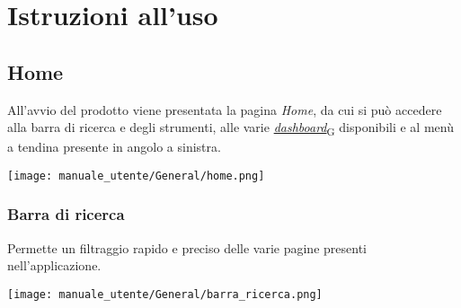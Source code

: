 \section{Istruzioni all'uso}
\subsection{Home}
All'avvio del prodotto viene presentata la pagina \textit{Home}, da cui si può accedere alla barra di ricerca e degli strumenti, alle varie \href{https://7last.github.io/docs/pb/documentazione-interna/glossario\#dashboard}{\textit{dashboard}\textsubscript{G}} disponibili e al menù a tendina presente in angolo a sinistra.
\begin{center}
    \texttt{[image: manuale\_utente/General/home.png]}
\end{center}
\newpage
\subsubsection{Barra di ricerca}
Permette un filtraggio rapido e preciso delle varie pagine presenti nell'applicazione. 
\begin{center}
    \texttt{[image: manuale\_utente/General/barra\_ricerca.png]}
\end{center}

